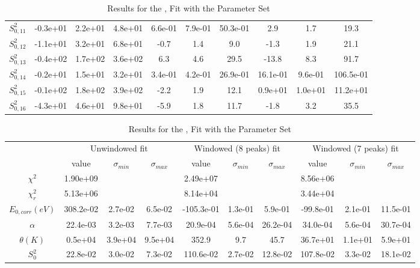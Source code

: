 \documentclass{article}
\begin{document}
\begin{landscape}
\begin{table}[ht]
\begin{tabular}{c|c|c|c|c|c|c|c|c|c}
$S^2_{0,11}$& -0.3e+01 & 2.2e+01 & 4.8e+01 & 6.6e-01 & 7.9e-01 & 50.3e-01 & 2.9 & 1.7 & 19.3 \\
$S^2_{0,12}$& -1.1e+01 & 3.2e+01 & 6.8e+01 & -0.7 & 1.4 & 9.0 & -1.3 & 1.9 & 21.1 \\
$S^2_{0,13}$& -0.4e+02 & 1.7e+02 & 3.6e+02 & 6.3 & 4.6 & 29.5 & -13.8 & 8.3 & 91.7 \\
$S^2_{0,14}$& -0.2e+01 & 1.5e+01 & 3.2e+01 & 3.4e-01 & 4.2e-01 & 26.9e-01 & 16.1e-01 & 9.6e-01 & 106.5e-01 \\
$S^2_{0,15}$& -0.1e+02 & 1.8e+02 & 3.9e+02 & -2.2 & 1.9 & 12.1 & 0.9e+01 & 1.0e+01 & 11.2e+01 \\
$S^2_{0,16}$& -4.3e+01 & 4.6e+01 & 9.8e+01 & -5.9 & 1.8 & 11.7 & -1.8 & 3.2 & 35.5 \\
\hline
    \end{tabular}
    \caption{Results for the ,  Fit with the  Parameter Set}
\end{table}
\begin{table}[ht]
\centering
\begin{tabular}{c|c|c|c|c|c|c|c|c|c}
\hline
&\multicolumn{3}{|c}{Unwindowed fit}&\multicolumn{3}{|c}{Windowed (8 peaks) fit}&\multicolumn{3}{|c}{Windowed (7 peaks) fit}\\
& value & $\sigma_{min}$ & $\sigma_{max}$& value & $\sigma_{min}$ & $\sigma_{max}$& value & $\sigma_{min}$ & $\sigma_{max}$\\
\hline
$\chi^2$   & 1.90e+09 & & & 2.49e+07 & & & 8.56e+06 & & \\
$\chi^2_r$ & 5.13e+06 & & & 8.14e+04 & & & 3.44e+04 & & \\
\hline
$E_{0,corr} (eV)$& 308.2e-02 & 2.7e-02 & 6.5e-02 & -105.3e-01 & 1.3e-01 & 5.9e-01 & -99.8e-01 & 2.1e-01 & 11.5e-01 \\
$\alpha $       & 22.4e-03 & 3.2e-03 & 7.7e-03 & 20.9e-04 & 5.6e-04 & 26.2e-04 & 34.0e-04 & 5.6e-04 & 30.7e-04 \\
$\theta (K) $   & 0.5e+04 & 3.9e+04 & 9.5e+04 & 352.9 & 9.7 & 45.7 & 36.7e+01 & 1.1e+01 & 5.9e+01 \\
$S^2_{0}$& 22.8e-02 & 3.0e-02 & 7.3e-02 & 110.6e-02 & 2.7e-02 & 12.8e-02 & 107.8e-02 & 3.3e-02 & 18.1e-02 \\
\hline
    \end{tabular}
    \caption{Results for the ,  Fit with the  Parameter Set}
\end{table}
\end{landscape}
\end{document}
